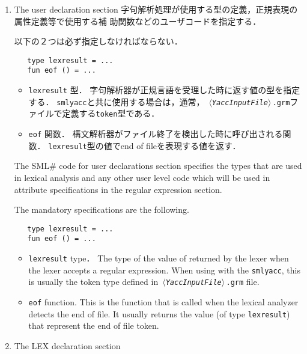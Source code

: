 \documentclass{jbook}
\newcommand{\txt}[2]{#2}
\newcommand{\smlsharp}{SML\#}
\newcommand{\code}[1]{\mbox{\large\tt #1}}
\newcommand{\nonterm}[1]{\mbox{$\,\langle$}{\it #1}\mbox{$\rangle\,$}}
\begin{document}
\begin{enumerate}
\item \txt{ユーザ定義セクション}{The user declaration section}
\ifjp%
	字句解析処理が使用する型の定義，正規表現の属性定義等で使用する補
助関数などのユーザコードを指定する．

	以下の２つは必ず指定しなければならない．
\begin{verbatim}
   type lexresult = ...
   fun eof () = ...
\end{verbatim}

\begin{itemize}
\item \code{lexresult} 型．
	字句解析器が正規言語を受理した時に返す値の型を指定する．
	\code{smlyacc}と共に使用する場合は，通常，
\code{\nonterm{YaccInputFile}.grm}ファイルで定義する\code{token}型である．

\item \code{eof} 関数．
	構文解析器がファイル終了を検出した時に呼び出される関数．
	\code{lexresult}型の値でend of fileを表現する値を返す．
\end{itemize}

\else%
	The \smlsharp{} code for user declarations section specifies 
the types that are used in lexical analysis and any other user level
code which will be used in attribute specifications in the regular
expression section. 

	The mandatory specifications are the following.
\begin{verbatim}
   type lexresult = ... 
   fun eof () = ...
\end{verbatim}

\begin{itemize}
\item \code{lexresult} type．
	The type of the value of returned by the lexer when the lexer
accepts a regular expression.
	When using with the \code{smlyacc}, this is usually the token
type defined in \code{\nonterm{YaccInputFile}.grm} file.
\item \code{eof} function.
	This is the function that is called when the lexical analyzer
detects the end of file.
	It usually returns the value (of type \code{lexresult}) that
represent the end of file token.
\end{itemize}
\fi%

\item \txt{LEX宣言セクション}{The LEX declaration section}


\end{enumerate}
\end{document}
